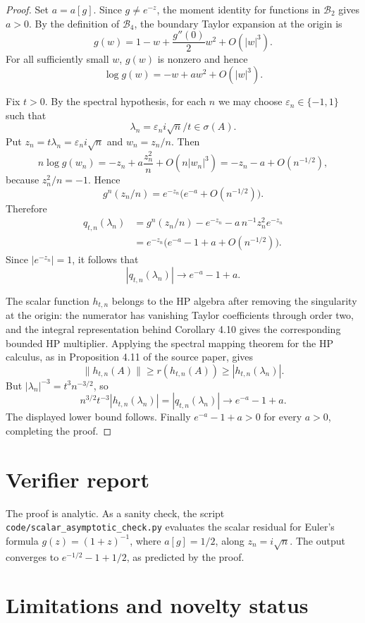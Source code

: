 \documentclass[11pt]{article}
\newcommand{\cB}{\mathcal B}
\begin{document}
\begin{proof}
Set \(a=a[g]\).  Since \(g\neq e^{-z}\), the moment identity for functions in
\(\cB_2\) gives \(a>0\).  By the definition of \(\cB_4\), the boundary Taylor
expansion at the origin is
\[
  g(w)=1-w+\frac{g''(0)}2w^2+O(|w|^3).
\]
For all sufficiently small \(w\), \(g(w)\) is nonzero and hence
\[
  \log g(w)=-w+a w^2+O(|w|^3).
\]

Fix \(t>0\).  By the spectral hypothesis, for each \(n\) we may choose
\(\varepsilon_n\in\{-1,1\}\) such that
\[
  \lambda_n=\varepsilon_n i\sqrt n/t\in\sigma(A).
\]
Put \(z_n=t\lambda_n=\varepsilon_n i\sqrt n\) and \(w_n=z_n/n\).  Then
\[
 n\log g(w_n)
 =-z_n+a\frac{z_n^2}{n}+O(n|w_n|^3)
 =-z_n-a+O(n^{-1/2}),
\]
because \(z_n^2/n=-1\).  Hence
\[
  g^n(z_n/n)=e^{-z_n}\big(e^{-a}+O(n^{-1/2})\big).
\]
Therefore
\[
\begin{aligned}
 q_{t,n}(\lambda_n)
 &=g^n(z_n/n)-e^{-z_n}-a\,n^{-1}z_n^2e^{-z_n}\\
 &=e^{-z_n}\big(e^{-a}-1+a+O(n^{-1/2})\big).
\end{aligned}
\]
Since \(|e^{-z_n}|=1\), it follows that
\[
  |q_{t,n}(\lambda_n)|\longrightarrow e^{-a}-1+a .
\]

The scalar function \(h_{t,n}\) belongs to the HP algebra after removing the
singularity at the origin: the numerator has vanishing Taylor coefficients
through order two, and the integral representation behind Corollary 4.10
gives the corresponding bounded HP multiplier.  Applying the spectral mapping
theorem for the HP calculus, as in Proposition 4.11 of the source paper, gives
\[
  \|h_{t,n}(A)\|
  \geq r(h_{t,n}(A))
  \geq |h_{t,n}(\lambda_n)|.
\]
But \(|\lambda_n|^{-3}=t^3n^{-3/2}\), so
\[
  n^{3/2}t^{-3}|h_{t,n}(\lambda_n)|
  =|q_{t,n}(\lambda_n)|
  \longrightarrow e^{-a}-1+a .
\]
The displayed lower bound follows.  Finally \(e^{-a}-1+a>0\) for every
\(a>0\), completing the proof.
\end{proof}

\section*{Verifier report}

The proof is analytic.  As a sanity check, the script
\texttt{code/scalar\_asymptotic\_check.py} evaluates the scalar residual for
Euler's formula \(g(z)=(1+z)^{-1}\), where \(a[g]=1/2\), along
\(z_n=i\sqrt n\).  The output converges to
\(e^{-1/2}-1+1/2\), as predicted by the proof.

\section*{Limitations and novelty status}
\end{document}
